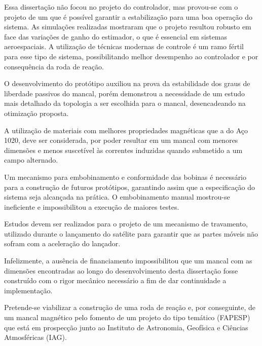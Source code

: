 Essa dissertação não focou no projeto do controlador, mas provou-se com o projeto de um que é possível garantir a estabilização para uma boa operação do sistema. As simulações realizadas mostraram que o projeto resultou robusto em face das variações de ganho do estimador, o que é essencial em sistemas aeroespaciais. A utilização de técnicas modernas de controle é um ramo fértil para esse tipo de sistema, possibilitando melhor desempenho ao controlador e por consequência da roda de reação. 

O desenvolvimento do protótipo auxiliou na prova da estabilidade dos graus de liberdade passivos do mancal, porém demonstrou a necessidade de um estudo mais detalhado da topologia a ser escolhida para o mancal, desencadeando na otimização proposta.

A utilização de materiais com melhores propriedades magnéticas que a do Aço 1020, deve ser considerada, por poder resultar em um mancal com menores dimensões e menos suscetível às correntes induzidas \citep{Ravaud2009} quando submetido a um campo alternado.

Um mecanismo para embobinamento e conformidade das bobinas é necessário para a construção de futuros protótipos, garantindo assim que a especificação do sistema seja alcançada na prática. O embobinamento manual mostrou-se ineficiente e impossibilitou a execução de maiores testes. 

Estudos devem ser realizados para o projeto de um mecanismo de travamento, utilizado durante o lançamento do satélite para garantir que as partes móveis não sofram com a aceleração do lançador.

Infelizmente, a ausência de financiamento impossibilitou que um mancal com as dimensões encontradas ao longo do desenvolvimento desta dissertação fosse construído com o rigor mecânico necessário a fim de dar continuidade a implementação. 

Pretende-se viabilizar a construção de uma roda de reação e, por conseguinte, de um mancal magnético pelo fomento de um projeto do tipo temático (FAPESP) que está em prospecção junto ao Instituto de Astronomia, Geofísica e Ciências Atmosféricas (IAG).




